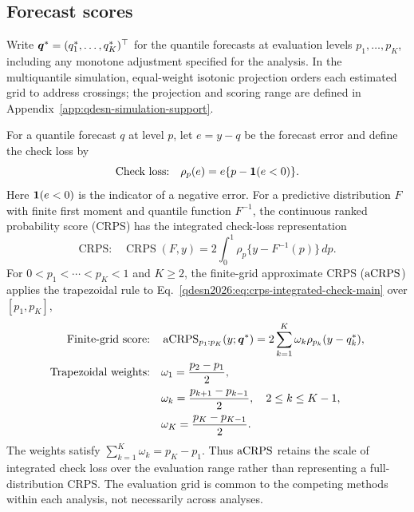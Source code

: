 \subsection{Forecast scores}

Write \(\boldsymbol{q}^*=(q_1^*,\ldots,q_K^*)^\top\) for the quantile forecasts at
evaluation levels \(p_1,\ldots,p_K\), including any monotone adjustment
specified for the analysis. In the multiquantile simulation, equal-weight
isotonic projection orders each estimated grid to
address crossings; the projection and scoring range are defined in
Appendix~\ref{app:qdesn-simulation-support}.

For a quantile forecast \(q\) at level \(p\), let \(e=y-q\) be the forecast
error and define the check loss by
\begin{equation}
\text{Check loss:}\quad \rho_p(e)=e\{p-\mathbf{1}(e<0)\}.
\label{qdesn2026:eq:check-loss-main}
\end{equation}
Here \(\mathbf{1}(e<0)\) is the indicator of a negative error. For a predictive
distribution \(F\) with finite first moment and quantile function \(F^{-1}\),
the continuous ranked probability score (CRPS) has the integrated check-loss
representation
\citep{exd-gneiting2007}
\begin{equation}
\text{CRPS:}\quad \operatorname{CRPS}(F,y)
=2\int_0^1\rho_p\{y-F^{-1}(p)\}\,dp.
\label{qdesn2026:eq:crps-integrated-check-main}
\end{equation}
For \(0<p_1<\cdots<p_K<1\) and \(K\geq2\), the finite-grid approximate
CRPS (\(\operatorname{aCRPS}\)) applies the trapezoidal rule to
Eq.~\eqref{qdesn2026:eq:crps-integrated-check-main} over \([p_1,p_K]\),
\begin{equation}
\begin{aligned}
\text{Finite-grid score:}\quad
&\operatorname{aCRPS}_{p_1:p_K}(y;\boldsymbol{q}^*)
 =2\sum_{k=1}^K\omega_k\rho_{p_k}(y-q_k^*),\\
\text{Trapezoidal weights:}\quad
&\omega_1=\frac{p_2-p_1}{2},\\
&\omega_k=\frac{p_{k+1}-p_{k-1}}{2},\quad 2\leq k\leq K-1,\\
&\omega_K=\frac{p_K-p_{K-1}}{2}.
\end{aligned}
\label{qdesn2026:eq:acrps-main}
\end{equation}
The weights satisfy
\(\sum_{k=1}^K\omega_k=p_K-p_1\). Thus \(\operatorname{aCRPS}\) retains the scale of integrated
check loss over the evaluation range rather than representing a full-distribution
CRPS. The evaluation grid is common to the competing methods within each
analysis, not necessarily across analyses.

